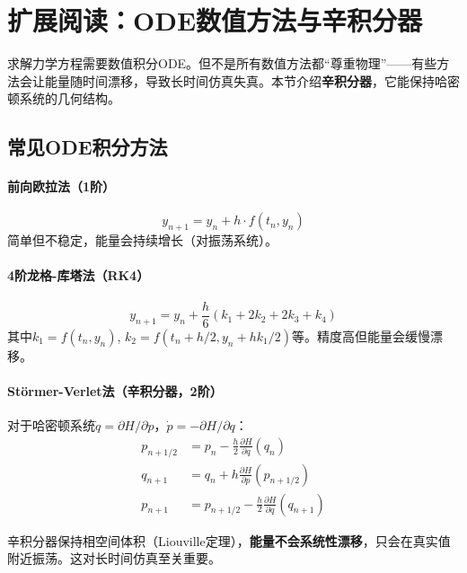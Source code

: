 \section*{扩展阅读：ODE数值方法与辛积分器}

求解力学方程需要数值积分ODE。但不是所有数值方法都“尊重物理”——有些方法会让能量随时间漂移，导致长时间仿真失真。本节介绍\textbf{辛积分器}，它能保持哈密顿系统的几何结构。

\subsection*{常见ODE积分方法}

\paragraph{前向欧拉法（1阶）}
\begin{equation}
y_{n+1} = y_n + h \cdot f(t_n, y_n)
\end{equation}
简单但不稳定，能量会持续增长（对振荡系统）。

\paragraph{4阶龙格-库塔法（RK4）}
\begin{equation}
y_{n+1} = y_n + \frac{h}{6}(k_1 + 2k_2 + 2k_3 + k_4)
\end{equation}
其中$k_1 = f(t_n, y_n)$, $k_2 = f(t_n + h/2, y_n + hk_1/2)$等。精度高但能量会缓慢漂移。

\paragraph{Störmer-Verlet法（辛积分器，2阶）}

对于哈密顿系统$\dot{q} = \partial H/\partial p$，$\dot{p} = -\partial H/\partial q$：
\begin{align}
p_{n+1/2} &= p_n - \frac{h}{2} \frac{\partial H}{\partial q}(q_n) \\
q_{n+1} &= q_n + h \frac{\partial H}{\partial p}(p_{n+1/2}) \\
p_{n+1} &= p_{n+1/2} - \frac{h}{2} \frac{\partial H}{\partial q}(q_{n+1})
\end{align}

\begin{tcolorbox}[colback=blue!5, colframe=blue!60!black, title=辛积分器的关键性质]
辛积分器保持相空间体积（Liouville定理），\textbf{能量不会系统性漂移}，只会在真实值附近振荡。这对长时间仿真至关重要。
\end{tcolorbox}

